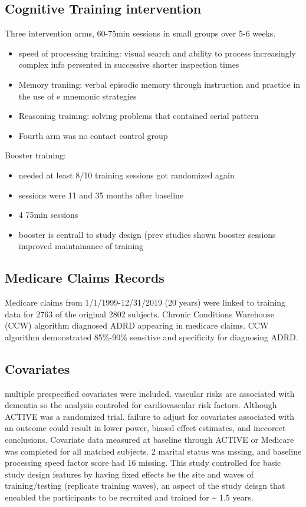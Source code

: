 \documentclass[11pt]{article}
\begin{document}
\subsection{Cognitive Training intervention}
\label{sec:org9e482fc}

Three intervention arms, 60-75min sessions in small groups over 5-6 weeks.
\begin{itemize}
\item speed of processing training: visual search and ability to process increasingly complex info persented in successive shorter inspection times
\item Memory traniing: verbal episodic memory through instruction and practice in the use of e mnemonic strategies
\item Reasoning training: solving problems that contained serial pattern
\item Fourth arm was no contact control group
\end{itemize}
Booster training:
\begin{itemize}
\item needed at least 8/10 training sessions got randomized again
\item sessions were 11 and 35 months after baseline
\item 4 75min sessions
\item booster is centrall to study design (prev studies shown booster sessions improved maintainance of training
\end{itemize}

\subsection{Medicare Claims Records}
\label{sec:orgaf0d7f4}

Medicare claims from 1/1/1999-12/31/2019 (20 years) were linked to training data for 2763 of the original 2802 subjects. Chronic Conditions Warehouse (CCW) algorithm diagnosed ADRD appearing in medicare claims. CCW algorithm demonstrated 85\%-90\% sensitive and specificity for diagnosing ADRD.

\subsection{Covariates}
\label{sec:orge8e8aaa}

multiple prespecified covariates were included. vascular risks are associated with dementia so the analysis controled for cardiovascular risk factors. Although ACTIVE was a randomized trial. failure to adjust for covariates associated with an outcome could result in lower power, biased effect estimates, and inccorect conclusions.
Covariate data measured at baseline through ACTIVE or Medicare was completed for all matched subjects. 2 marital status was mssing, and baseline processing speed factor score had 16 missing. This study controlled for basic study design features by having fixed effects be the site and waves of training/testing (replicate training waves), an aspect of the study deisgn that eneabled the participants to be recruited and trained for \textasciitilde{} 1.5 years.
\end{document}

